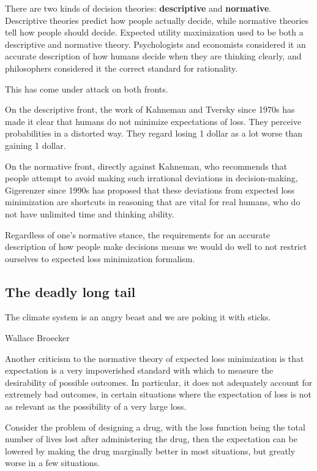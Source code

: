 There are two kinds of decision theories: \textbf{descriptive} and \textbf{normative}. Descriptive theories predict how people actually decide, while normative theories tell how people should decide. Expected utility maximization used to be both a descriptive and normative theory. Psychologists and economists considered it an accurate description of how humans decide when they are thinking clearly, and philosophers considered it the correct standard for rationality.

This has come under attack on both fronts. 

On the descriptive front, the work of Kahneman and Tversky since 1970s \cite{tverskyJudgmentUncertaintyHeuristics1974} has made it clear that humans do not minimize expectations of loss. They perceive probabilities in a distorted way. They regard losing 1 dollar as a lot worse than gaining 1 dollar. 

On the normative front, directly against Kahneman, who recommends that people attempt to avoid making such irrational deviations in decision-making, Gigerenzer since 1990s \cite{gigerenzerHomoHeuristicusWhy2009} has proposed that these deviations from expected loss minimization are shortcuts in reasoning that are vital for real humans, who do not have unlimited time and thinking ability. 

Regardless of one's normative stance, the requirements for an accurate description of how people make decisions means we would do well to not restrict ourselves to expected loss minimization formalism.

\subsection{The deadly long tail}
\setlength{\epigraphwidth}{0.6\textwidth}
\epigraph{The climate system is an angry beast and we are poking it with sticks.}{Wallace Broecker}

Another criticism to the normative theory of expected loss minimization is that expectation is a very impoverished standard with which to measure the desirability of possible outcomes. In particular, it does not adequately account for extremely bad outcomes, in certain situations where the expectation of loss is not as relevant as the possibility of a very large loss.

Consider the problem of designing a drug, with the loss function being the total number of lives lost after administering the drug, then the expectation can be lowered by making the drug marginally better in most situations, but greatly worse in a few situations. 

